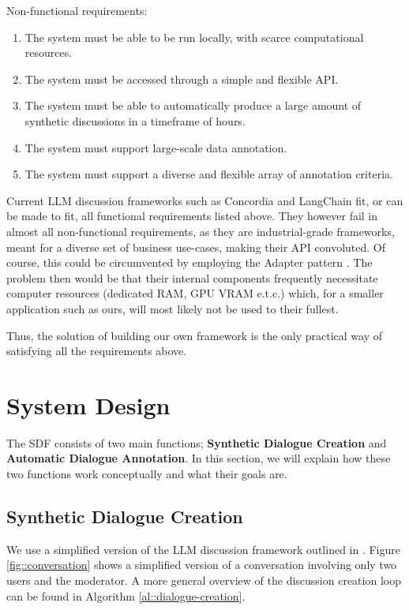 Non-functional requirements:
\begin{enumerate}
	\item The system must be able to be run locally, with scarce computational resources.
	\item The system must be accessed through a simple and flexible \ac{API}.
	\item The system must be able to automatically produce a large amount of synthetic discussions in a timeframe of hours.
	\item The system must support large-scale data annotation.
	\item The system must support a diverse and flexible array of annotation criteria.
\end{enumerate}

Current LLM discussion frameworks such as Concordia \cite{Vezhnevets2023GenerativeAM} and LangChain \cite{langchain} fit, or can be made to fit, all functional requirements listed above. They however fail in almost all non-functional requirements, as they are industrial-grade frameworks, meant for a diverse set of business use-cases, making their \ac{API} convoluted. Of course, this could be circumvented by employing the Adapter pattern \cite{gamma1995design}. The problem then would be that their internal components frequently necessitate computer resources (dedicated RAM, GPU VRAM e.t.c.) which, for a smaller application such as ours, will most likely not be used to their fullest.

Thus, the solution of building our own framework is the only practical way of satisfying all the requirements above.



\section{System Design}
\label{sec:system:design-system}

The \ac{SDF} consists of two main functions; \textbf{Synthetic Dialogue Creation} and \textbf{Automatic Dialogue Annotation}. In this section, we will explain how these two functions work conceptually and what their goals are.


\subsection{Synthetic Dialogue Creation}
\label{ssec:system:creation}

We use a simplified version of the LLM discussion framework outlined in \citet{abdelnabi2024cooperationcompetitionmaliciousnessllmstakeholders}. Figure \ref{fig::conversation} shows a simplified version of a conversation involving only two users and the moderator. A more general overview of the discussion creation loop can be found in Algorithm \ref{al::dialogue-creation}.

